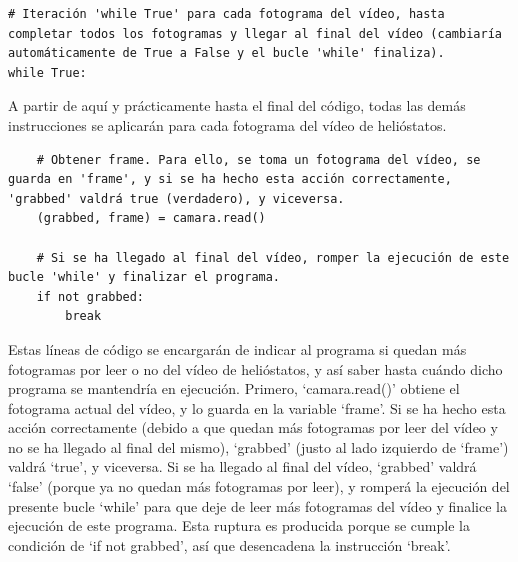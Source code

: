 \begin{lstlisting}
# Iteración 'while True' para cada fotograma del vídeo, hasta completar todos los fotogramas y llegar al final del vídeo (cambiaría automáticamente de True a False y el bucle 'while' finaliza).
while True:
\end{lstlisting}

A partir de aquí y prácticamente hasta el final del código, todas las demás instrucciones se aplicarán para cada fotograma del vídeo de helióstatos.\\[20pt]
    
\begin{lstlisting}
    # Obtener frame. Para ello, se toma un fotograma del vídeo, se guarda en 'frame', y si se ha hecho esta acción correctamente, 'grabbed' valdrá true (verdadero), y viceversa.
    (grabbed, frame) = camara.read()

    # Si se ha llegado al final del vídeo, romper la ejecución de este bucle 'while' y finalizar el programa.
    if not grabbed:
        break
\end{lstlisting}

Estas líneas de código se encargarán de indicar al programa si quedan más fotogramas por leer o no del vídeo de helióstatos, y así saber hasta cuándo dicho programa se mantendría en ejecución. Primero, ‘camara.read()’ obtiene el fotograma actual del vídeo, y lo guarda en la variable ‘frame’. Si se ha hecho esta acción correctamente (debido a que quedan más fotogramas por leer del vídeo y no se ha llegado al final del mismo), ‘grabbed’ (justo al lado izquierdo de ‘frame’) valdrá ‘true’, y viceversa. Si se ha llegado al final del vídeo, ‘grabbed’ valdrá ‘false’ (porque ya no quedan más fotogramas por leer), y romperá la ejecución del presente bucle ‘while’ para que deje de leer más fotogramas del vídeo y finalice la ejecución de este programa. Esta ruptura es producida porque se cumple la condición de ‘if not grabbed’, así que desencadena la instrucción ‘break’.\\[20pt]

